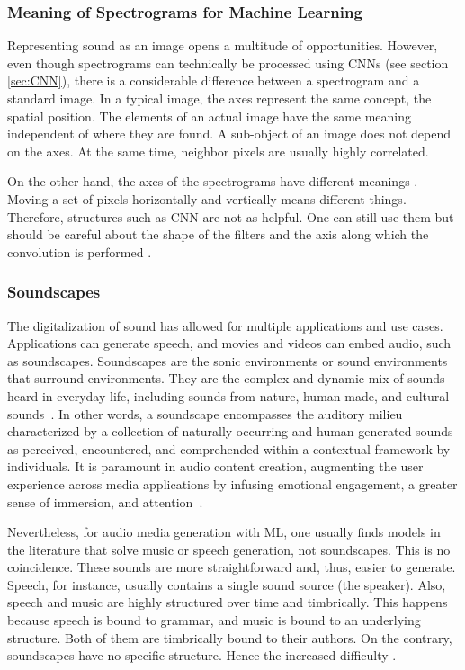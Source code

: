 \subsubsection{Meaning of Spectrograms for Machine Learning}

Representing sound as an image opens a multitude of opportunities. However, even though spectrograms can technically be processed using \acp{CNN} (see section \ref{sec:CNN}), there is a considerable difference between a spectrogram and a standard image. In a typical image, the axes represent the same concept, the spatial position. The elements of an actual image have the same meaning independent of where they are found. A sub-object of an image does not depend on the axes. At the same time, neighbor pixels are usually highly correlated.

On the other hand, the axes of the spectrograms have different meanings \cite{benois-pineau_deep_2021}. Moving a set of pixels horizontally and vertically means different things. Therefore, structures such as \ac{CNN} are not as helpful. One can still use them but should be careful about the shape of the filters and the axis along which the convolution is performed \cite{benois-pineau_deep_2021}.

\subsubsection{Soundscapes} \label{sec:soundscapes}

The digitalization of sound has allowed for multiple applications and use cases. Applications can generate speech, and movies and videos can embed audio, such as soundscapes. Soundscapes are the sonic environments or sound environments that surround environments. They are the complex and dynamic mix of sounds heard in everyday life, including sounds from nature, human-made, and cultural sounds~\cite{international_organization_for_standardization_iso_2014, schafer_tuning_1977}. In other words, a soundscape encompasses the auditory milieu characterized by a collection of naturally occurring and human-generated sounds as perceived, encountered, and comprehended within a contextual framework by individuals. It is paramount in audio content creation, augmenting the user experience across media applications by infusing emotional engagement, a greater sense of immersion, and attention~\cite{chandrasekera_virtual_2015}.

Nevertheless, for audio media generation with \ac{ML}, one usually finds models in the literature that solve music or speech generation, not soundscapes. This is no coincidence. These sounds are more straightforward and, thus, easier to generate. Speech, for instance, usually contains a single sound source (the speaker). Also, speech and music are highly structured over time and timbrically. This happens because speech is bound to grammar, and music is bound to an underlying structure. Both of them are timbrically bound to their authors. On the contrary, soundscapes have no specific structure. Hence the increased difficulty \cite{benois-pineau_deep_2021}.
